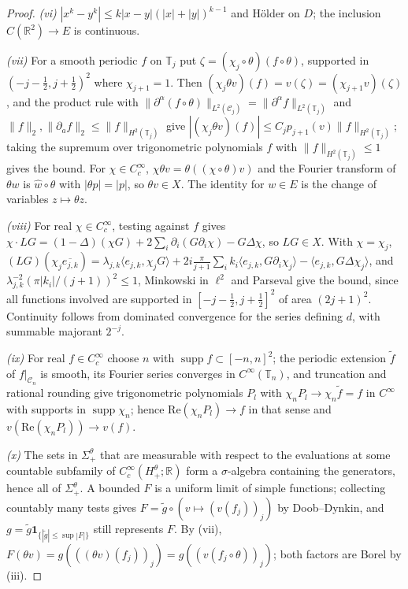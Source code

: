 \documentclass[11pt]{article}
\theoremstyle{plain}
\theoremstyle{definition}
\theoremstyle{remark}
\newcommand{\R}{\mathbb{R}}
\newcommand{\T}{\mathbb{T}}
\newcommand{\cC}{\mathcal{C}}
\newcommand{\ind}{\mathbf{1}}
\newcommand{\conj}[1]{\overline{#1}}
\DeclareMathOperator{\supp}{supp}
\begin{document}
\begin{proof}
\emph{(vi)} $|x^{k}-y^{k}|\le k|x-y|(|x|+|y|)^{k-1}$ and H\"older on $D$; the
inclusion $C(\R^{2})\to E$ is continuous.

\emph{(vii)} For a smooth periodic $f$ on $\T_j$ put
$\zeta=(\chi_j\circ\theta)(f\circ\theta)$, supported in $(-j-\tfrac12,j+\tfrac12)^{2}$
where $\chi_{j+1}=1$. Then $(\chi_j\theta v)(f)=v(\zeta)=(\chi_{j+1}v)(\zeta)$, and the
product rule with $\|\partial^{\alpha}(f\circ\theta)\|_{L^{2}(\cC_j)}=\|\partial^{\alpha}f\|_{L^{2}(\T_j)}$
and $\|f\|_2,\|\partial_af\|_2\le\|f\|_{H^{2}(\T_j)}$ give
$|(\chi_j\theta v)(f)|\le C_jp_{j+1}(v)\|f\|_{H^{2}(\T_j)}$; taking the supremum over
trigonometric polynomials $f$ with $\|f\|_{H^{2}(\T_j)}\le1$ gives the bound. For
$\chi\in C_c^{\infty}$, $\chi\theta v=\theta((\chi\circ\theta)v)$ and the Fourier transform
of $\theta w$ is $\hat w\circ\theta$ with $|\theta p|=|p|$, so $\theta v\in X$. The identity
for $w\in E$ is the change of variables $z\mapsto\theta z$.

\emph{(viii)} For real $\chi\in C_c^{\infty}$, testing against $f$ gives
$\chi\cdot LG=(1-\Delta)(\chi G)+2\sum_i\partial_i(G\partial_i\chi)-G\Delta\chi$, so $LG\in X$.
With $\chi=\chi_j$, $(LG)(\chi_j\conj{e_{j,k}})=\lambda_{j,k}\langle e_{j,k},\chi_jG\rangle
+2i\tfrac{\pi}{j+1}\sum_ik_i\langle e_{j,k},G\partial_i\chi_j\rangle-\langle e_{j,k},G\Delta\chi_j\rangle$,
and $\lambda_{j,k}^{-2}(\pi|k_i|/(j+1))^{2}\le1$, Minkowski in $\ell^{2}$ and Parseval give
the bound, since all functions involved are supported in $[-j-\tfrac12,j+\tfrac12]^{2}$
of area $(2j+1)^{2}$. Continuity follows from dominated convergence for the
series defining $d$, with summable majorant $2^{-j}$.

\emph{(ix)} For real $f\in C_c^{\infty}$ choose $n$ with $\supp f\subset[-n,n]^{2}$; the
periodic extension $\tilde f$ of $f|_{\cC_n}$ is smooth, its Fourier series
converges in $C^{\infty}(\T_n)$, and truncation and rational rounding give
trigonometric polynomials $P_l$ with $\chi_nP_l\to\chi_n\tilde f=f$ in $C^{\infty}$ with
supports in $\supp\chi_n$; hence $\mathrm{Re}(\chi_nP_l)\to f$ in that sense and
$v(\mathrm{Re}(\chi_nP_l))\to v(f)$.

\emph{(x)} The sets in $\Sigma^{\theta}_{+}$ that are measurable with respect to the
evaluations at some countable subfamily of $C_c^{\infty}(H^{\theta}_{+};\R)$ form a
$\sigma$-algebra containing the generators, hence all of $\Sigma^{\theta}_{+}$. A
bounded $F$ is a uniform limit of simple functions; collecting countably many
tests gives $F=\tilde g\circ(v\mapsto(v(f_j))_j)$ by Doob--Dynkin, and
$g=\tilde g\ind_{\{|\tilde g|\le\sup|F|\}}$ still represents $F$. By (vii),
$F(\theta v)=g(((\theta v)(f_j))_j)=g((v(f_j\circ\theta))_j)$; both factors are Borel
by (iii).
\end{proof}
\end{document}
